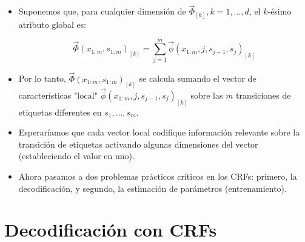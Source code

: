 \begin{itemize}

\item Suponemos que, para cualquier dimensión de $\vec{\Phi}_{[k]}, k= 1, \dots, d$, el $k$-ésimo atributo global es:

\begin{displaymath}
\vec{\Phi}(x_{1:m},s_{1:m})_{[k]} = \sum_{j=1}^{m} \vec{\phi}(x_{1:m},j,s_{j-1},s_j)_{[k]}
\end{displaymath}

\item Por lo tanto, $\vec{\Phi}(x_{1:m},s_{1:m})_{[k]}$ se calcula sumando el vector de características "local" $\vec{\phi}(x_{1:m},j,s_{j-1},s_j)_{[k]}$ sobre las $m$ transiciones de etiquetas diferentes en $s_1,\dots,s_m$.

\item Esperaríamos que cada vector local codifique información relevante sobre la transición de etiquetas activando algunas dimensiones del vector (estableciendo el valor en uno).

\item Ahora pasamos a dos problemas prácticos críticos en los CRFs: primero, la decodificación, y segundo, la estimación de parámetros (entrenamiento).

\end{itemize}



\section{Decodificación con CRFs}

